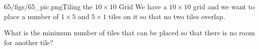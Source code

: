 \begin{problem}{65/figs/65_pic.png}{Tiling the $10 \times 10$ Grid} We have a  $10 \times 10$ grid and we want to place a number of $1 \times 5$ and $5 \times 1$ tiles on it so that no two tiles overlap.
	
	What is the minimum number of tiles that can be placed so that there is no room for another tile?
\end{problem}